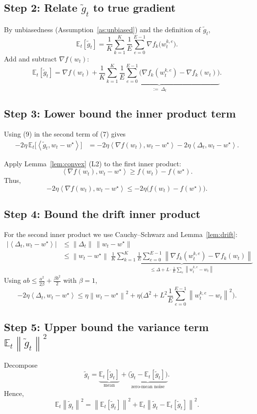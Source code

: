 \documentclass{article}
\newcommand{\E}{\mathbb{E}}
\newcommand{\norm}[1]{\left\|#1\right\|}
\newcommand{\inner}[2]{\left\langle #1,#2\right\rangle}
\begin{document}
\subsection*{Step 2: Relate $\widetilde g_t$ to true gradient}
By unbiasedness (Assumption~\ref{as:unbiased}) and the definition of $\widetilde g_t$,
\[
\E_t[\widetilde g_t]=\frac1{K}\sum_{k=1}^K\frac1E\sum_{e=0}^{E-1}
\nabla f_k\!\big(w_{t}^{k,e}\big).
\tag{8}
\]
Add and subtract $\nabla f(w_t)$:
\[
\E_t[\widetilde g_t]=\nabla f(w_t)+\underbrace{\frac1{K}\sum_{k=1}^K\frac1E\sum_{e=0}^{E-1}
\big(\nabla f_k(w_{t}^{k,e})-\nabla f_k(w_t)\big)}_{:=\; \Delta_t}.
\tag{9}
\]

\subsection*{Step 3: Lower bound the inner product term}
Using (9) in the second term of (7) gives
\[
\begin{aligned}
-2\eta\,\E_t\!\big[\inner{\widetilde g_t}{w_t-w^\star}\big]
&= -2\eta\inner{\nabla f(w_t)}{w_t-w^\star}
-2\eta\inner{\Delta_t}{w_t-w^\star}.
\end{aligned}
\tag{10}
\]

Apply Lemma~\ref{lem:convex} (L2) to the first inner product:
\[
\inner{\nabla f(w_t)}{w_t-w^\star}\ge f(w_t)-f(w^\star).
\tag{11}
\]
Thus,
\[
-2\eta\inner{\nabla f(w_t)}{w_t-w^\star}
\le -2\eta\big(f(w_t)-f(w^\star)\big).
\tag{12}
\]

\subsection*{Step 4: Bound the drift inner product}
For the second inner product we use Cauchy–Schwarz and Lemma~\ref{lem:drift}:
\[
\begin{aligned}
\big|\inner{\Delta_t}{w_t-w^\star}\big|
&\le \norm{\Delta_t}\,\norm{w_t-w^\star}\\
&\le \norm{w_t-w^\star}\;
\underbrace{\frac1{K}\sum_{k=1}^K\frac1E\sum_{e=0}^{E-1}
\norm{\nabla f_k(w_{t}^{k,e})-\nabla f_k(w_t)}}_{\le \Delta + L\cdot\frac1E\sum_{e}\norm{w_{t}^{k,e}-w_t}}
\end{aligned}
\tag{13}
\]
Using $ab\le \frac{a^2}{2\beta}+ \frac{\beta b^2}{2}$ with $\beta=1$,
\[
-2\eta\inner{\Delta_t}{w_t-w^\star}
\le \eta\norm{w_t-w^\star}^2 + \eta\Big(\Delta^2+L^2\frac1{E}\sum_{e=0}^{E-1}\norm{w_{t}^{k,e}-w_t}^2\Big).
\tag{14}
\]

\subsection*{Step 5: Upper bound the variance term $\E_t\norm{\widetilde g_t}^2$}
Decompose
\[
\widetilde g_t = \underbrace{\E_t[\widetilde g_t]}_{\text{mean}} + \underbrace{\big(\widetilde g_t-\E_t[\widetilde g_t]\big)}_{\text{zero‑mean noise}} .
\]
Hence,
\[
\E_t\norm{\widetilde g_t}^2
= \norm{\E_t[\widetilde g_t]}^2
+ \E_t\norm{\widetilde g_t-\E_t[\widetilde g_t]}^2 .
\tag{15}
\]
\end{document}
